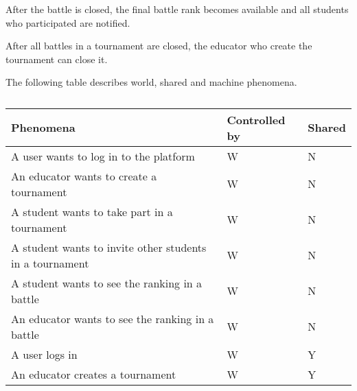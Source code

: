 After the battle is closed, the final battle rank becomes available and all students who participated are notified.

After all battles in a tournament are closed, the educator who create the tournament can close it.

The following table describes world, shared and machine phenomena.
\begin{center} %
    \begin{longtable}{|p{8.7cm}|p{3cm}|p{3cm}|}
        \caption[Phenomena Table]{}
        \label{table:phenomena}
        \endlastfoot
        \hline
        \rowcolor{gray!50}
        \textbf{Phenomena}                                                                                                                    & \textbf{Controlled by} & \textbf{Shared} \\ \hline
        A user wants to log in to the platform                                                                                                & W                      & N               \\ \hline
        An educator wants to create a tournament                                                                                              & W                      & N               \\ \hline
        A student wants to take part in a tournament                                                                                          & W                      & N               \\ \hline
        A student wants to invite other students in a tournament                                                                              & W                      & N               \\ \hline
        A student wants to see the ranking in a battle                                                                                        & W                      & N               \\ \hline
        An educator wants to see the ranking in a battle                                                                                      & W                      & N               \\ \hline
        A user logs in                                                                                                                        & W                      & Y               \\ \hline
        An educator creates a tournament                                                                                                      & W                      & Y               \\ \hline

\end{longtable}
\end{center}
